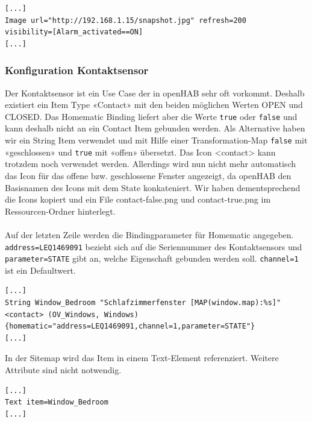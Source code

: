 \begin{lstlisting}[style=csharp, caption=demo.sitemap - Webcam Bild]
[...]
Image url="http://192.168.1.15/snapshot.jpg" refresh=200
visibility=[Alarm_activated==ON]
[...]
\end{lstlisting}




\subsubsection{Konfiguration Kontaktsensor} 
Der Kontaktsensor ist ein Use Case der in openHAB sehr oft vorkommt. Deshalb existiert ein Item Type «Contact» mit den beiden möglichen Werten OPEN und CLOSED. Das Homematic Binding liefert aber die Werte \lstinline!true! oder \lstinline!false! und kann deshalb nicht an ein Contact Item gebunden werden. Als Alternative haben wir ein String Item verwendet und mit Hilfe einer Transformation-Map \lstinline!false! mit «geschlossen» und \lstinline!true! mit «offen» übersetzt. Das Icon <contact> kann trotzdem noch verwendet werden. Allerdings wird nun nicht mehr automatisch das Icon für das offene bzw. geschlossene Fenster angezeigt, da openHAB den Basisnamen des Icons mit dem State konkateniert. Wir haben dementsprechend die Icons kopiert und ein File contact-false.png und contact-true.png im Ressourcen-Ordner hinterlegt.\\ \\
Auf der letzten Zeile werden die Bindingparameter für Homematic angegeben.\\ \lstinline!address=LEQ1469091! bezieht sich auf die Seriennummer des Kontaktsensors und\\ \lstinline!parameter=STATE! gibt an, welche Eigenschaft gebunden werden soll. \lstinline!channel=1! ist ein Defaultwert.

\begin{lstlisting}[style=csharp, caption=demo.items - Kontaktsensor]
[...]
String Window_Bedroom "Schlafzimmerfenster [MAP(window.map):%s]"
<contact> (OV_Windows, Windows)
{homematic="address=LEQ1469091,channel=1,parameter=STATE"}
[...]
\end{lstlisting}

In der Sitemap wird das Item in einem Text-Element referenziert. Weitere Attribute sind nicht notwendig.

\begin{lstlisting}[style=csharp, caption=demo.sitemap - Kontaktsensor]
[...]
Text item=Window_Bedroom
[...]
\end{lstlisting}

